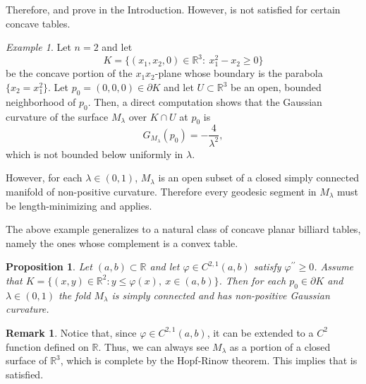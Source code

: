 \documentclass[11pt]{article}
\theoremstyle{definition}
\newtheorem{remark}[definition]{Remark}
\theoremstyle{remark}
\newtheorem{example}[definition]{Example}
\theoremstyle{plain}
\newtheorem{proposition}[definition]{Proposition}
\newcommand{\R}{\mathbb{R}}
\newcommand{\M}{M_\lambda}
\begin{document}
Therefore,  and  prove  in the Introduction. However,  is not satisfied for certain concave tables.

\begin{example}

Let $n=2$ and let 
$$K=\{(x_1,x_2,0)\in \R^3:\ x_1^2-x_2\ge0\}$$ 
be the concave portion of the $x_1x_2$-plane whose boundary is the parabola $\{x_2=x_1^2\}$. Let $p_0=(0,0,0)\in \partial K$ and let $U\subset \R^3$ be an open, bounded neighborhood of $p_0$. Then, a direct computation shows that the Gaussian curvature of the surface $\M$ over $K\cap U$ at $p_0$ is
$$G_{\M}(p_0) = -\frac{4}{\lambda^2},$$
which is not bounded below uniformly in $\lambda$.

However, for each $\lambda\in (0,1)$, $\M$ is an open subset of a closed simply connected manifold of non-positive curvature. Therefore every geodesic segment in $\M$ must be length-minimizing and  applies.

\end{example}

The above example generalizes to a natural class of concave planar billiard tables, namely the ones whose complement is a convex table.

\begin{proposition}\label{prop:concave_table}
Let $(a,b)\subset \R$ and let $\varphi\in C^{2,1}(a,b)$ satisfy $\varphi^{\prime\prime}\ge 0$. Assume that $K=\{(x,y)\in\R^2:y\le \varphi(x),\ x\in (a,b)\}$. Then for each $p_0\in \partial K$ and $\lambda\in (0,1)$ the fold $\M$ is simply connected and has non-positive Gaussian curvature.
\end{proposition}

\begin{remark}
  Notice that, since $\varphi\in C^{2,1}(a,b)$, it can be extended to a $C^2$ function defined on $\R$. Thus, we can always see $\M$ as a portion of a closed surface of $\R^3$, which is complete by the Hopf-Rinow theorem. This implies that  is satisfied.
\end{remark}
\end{document}

